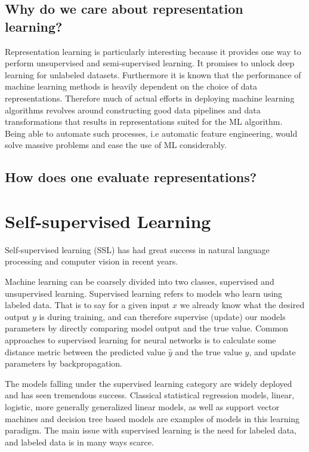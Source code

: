 \documentclass[../../thesis.tex]{subfiles}
\begin{document}
\subsection{Why do we care about representation learning?}

Representation learning is particularly interesting because it provides one way to perform unsupervised and semi-supervised learning. It promises to unlock deep learning for unlabeled datasets. Furthermore it is known that the performance of machine learning methods is heavily dependent on the choice of data representations. Therefore much of actual efforts in deploying machine learning algorithms revolves around constructing good data pipelines and data transformations that results in representations suited for the ML algorithm. Being able to automate such processes, i.e automatic feature engineering, would solve massive problems and ease the use of ML considerably. 



\subsection{How does one evaluate representations?}


\section{Self-supervised Learning}
Self-supervised learning (SSL) has had great success in natural language processing and computer vision in recent years. 

Machine learning can be coarsely divided into two classes, supervised and unsupervised learning. Supervised learning refers to models who learn using labeled data. That is to say for a given input $x$ we already know what the desired output $y$ is during training, and can therefore supervise (update) our models parameters by directly comparing model output and the true value. Common approaches to supervised learning for neural networks is to calculate some distance metric between the predicted value $\hat{y}$ and the true value $y$, and update parameters by backpropagation.

The models falling under the supervised learning category are widely deployed and has seen tremendous success. Classical statistical regression models, linear, logistic, more generally generalized linear models, as well as support vector machines and decision tree based models are examples of models in this learning paradigm. The main issue with supervised learning is the need for labeled data, and labeled data is in many ways scarce. 
\end{document}
